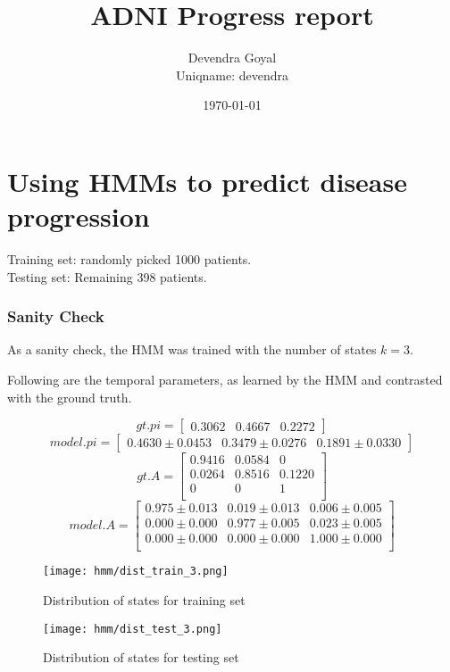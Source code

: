 \documentclass[12pt,a4paper]{article}
\title{ADNI Progress report}
\author{Devendra Goyal\\Uniqname: devendra}
\date{\today}
\begin{document}
\maketitle

\part{Using HMMs to predict disease progression}

Training set: randomly picked 1000 patients.\\
Testing set: Remaining 398 patients.

\section{Sanity Check}
\label{sec:sanity}

As a sanity check, the HMM was trained with the number of states
$k=3$.

Following are the temporal parameters, as learned by the HMM and
contrasted with the ground truth.

\[
gt.pi = \left[ 
\begin{array}{ccc} 
0.3062 & 0.4667 & 0.2272
\end{array}
 \right]
\]
\[
model.pi = \left[ 
\begin{array}{ccc} 
0.4630 \pm 0.0453 & 0.3479 \pm 0.0276 & 0.1891 \pm 0.0330
\end{array}
 \right]
\]
\[
gt.A = \left[ 
\begin{array}{ccc} 
0.9416 & 0.0584 & 0 \\
0.0264 & 0.8516 & 0.1220 \\
0 & 0 & 1 \\
\end{array}
 \right]
\]
\[
model.A = \left[ 
\begin{array}{ccc} 
0.975 \pm 0.013 & 0.019 \pm 0.013 & 0.006 \pm 0.005 \\
0.000 \pm 0.000 & 0.977 \pm 0.005 & 0.023 \pm 0.005 \\
0.000 \pm 0.000 & 0.000 \pm 0.000 & 1.000 \pm 0.000 \\
\end{array}
 \right]
\]

\begin{figure}[H]
  \centering
  \texttt{[image: hmm/dist\_train\_3.png]}
  \caption{Distribution of states for training set}  
\end{figure}

\begin{figure}[H]
  \texttt{[image: hmm/dist\_test\_3.png]}
  \caption{Distribution of states for testing set}  
\end{figure}
\end{document}
